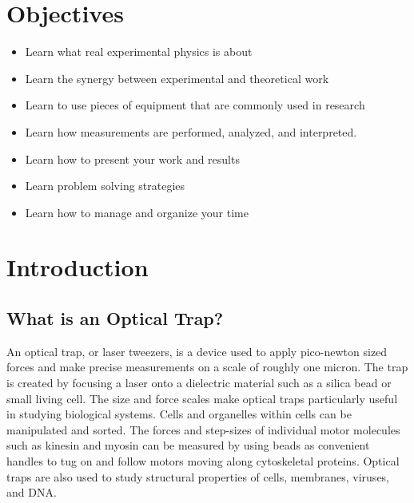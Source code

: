 \documentclass{../lab}
\begin{document}
\section{Objectives}

\begin{itemize}
    \item Learn what real experimental physics is about

    \item Learn the synergy between experimental and theoretical work

    \item Learn to use pieces of equipment that are commonly used in research

    \item Learn how measurements are performed, analyzed, and interpreted.

    \item Learn how to present your work and results

    \item Learn problem solving strategies

    \item Learn how to manage and organize your time
\end{itemize}

\section{Introduction}

\subsection{What is an Optical Trap?}

An optical trap, or laser tweezers, is a device used to apply pico-newton sized forces and make precise measurements on a scale of roughly one micron. The trap is created by focusing a laser onto a dielectric material such as a silica bead or small living cell. The size and force scales make optical traps particularly useful in studying biological systems. Cells and organelles within cells can be manipulated and sorted. The forces and step-sizes of individual motor molecules such as kinesin and myosin can be measured by using beads as convenient handles to tug on and follow motors moving along cytoskeletal proteins. Optical traps are also used to study structural properties of cells, membranes, viruses, and DNA.
\end{document}

